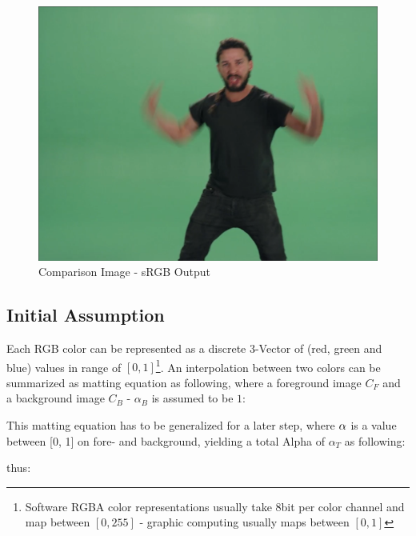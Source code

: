 \begin{figure}[htb]
	\includegraphics[width=\textwidth]{_raw_resources/Comparison_Example.png}
	\caption{Comparison Image \cite{vimeo:shia:2015} - sRGB Output}
	\label{fig:chroma:color}
\end{figure}

\subsection{Initial Assumption}

Each RGB color can be represented as a discrete 3-Vector of (red, green and 
blue)  values in range of $[0, 1]$\footnote{Software RGBA color representations 
usually take 8bit per color channel and map between $[0, 255]$ - graphic 
computing usually maps between $[0, 1]$}. An interpolation between two colors 
can be summarized as matting equation as following, where a foreground image 
$C_F$ and a background image $C_B$ - $\alpha_B$ is assumed to be $1$:


This matting equation has to be generalized for a later step, where 
$\protect\alpha$ is a value between [0, 1] on fore- and background, yielding a 
total Alpha of $\alpha_T$ as following:

 

thus:

